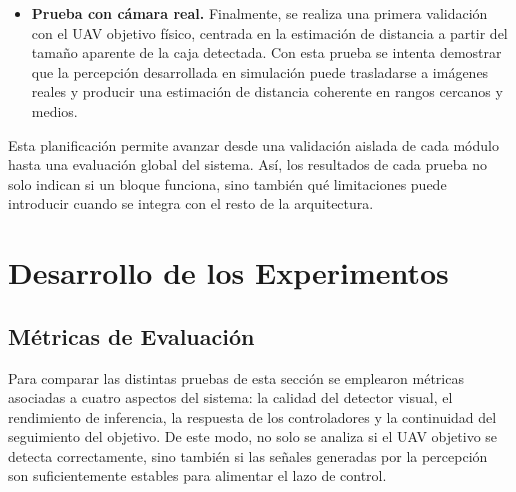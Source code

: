 \begin{itemize}
    \item \textbf{Prueba con cámara real.} Finalmente, se realiza una primera validación con el UAV objetivo físico, centrada en la estimación de distancia a partir del tamaño aparente de la caja detectada. Con esta prueba se intenta demostrar que la percepción desarrollada en simulación puede trasladarse a imágenes reales y producir una estimación de distancia coherente en rangos cercanos y medios.
\end{itemize}

\vspace{0.3cm}

Esta planificación permite avanzar desde una validación aislada de cada módulo hasta una evaluación global del sistema. Así, los resultados de cada prueba no solo indican si un bloque funciona, sino también qué limitaciones puede introducir cuando se integra con el resto de la arquitectura.


\section{Desarrollo de los Experimentos}

\subsection{Métricas de Evaluación}

Para comparar las distintas pruebas de esta sección se emplearon métricas asociadas a cuatro aspectos del sistema: la calidad del detector visual, el rendimiento de inferencia, la respuesta de los controladores y la continuidad del seguimiento del objetivo. De este modo, no solo se analiza si el UAV objetivo se detecta correctamente, sino también si las señales generadas por la percepción son suficientemente estables para alimentar el lazo de control.

\vspace{0.3cm}


